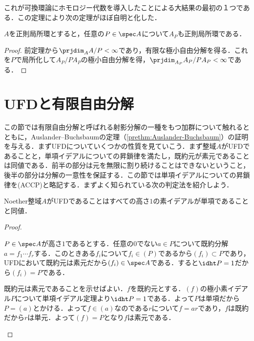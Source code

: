 これが可換環論にホモロジー代数を導入したことによる大結果の最初の１つである．この定理により次の定理がほぼ自明と化した．
\begin{thm}[Serreの定理]\label{thm:Serreの定理}
	$A$を正則局所環とすると，任意の$P\in\spec A$について$A_P$も正則局所環である．
\end{thm}

\begin{proof}
	前定理から$\prjdim_A A/P<\infty$であり，有限な極小自由分解を得る．これを$P$で局所化して$A_P/PA_P$の極小自由分解を得，$\prjdim_{A_P} A_P/PA_P<\infty$である．
\end{proof}

\section{UFDと有限自由分解}

この節では有限自由分解と呼ばれる射影分解の一種をもつ加群について触れるとともに，Auslander--Buchsbaumの定理（\ref{prethm:Auslander-Buchsbaum}）の証明を与える．まずUFDについていくつかの性質を見ていこう．まず整域$A$がUFDであることと，単項イデアルについての昇鎖律を満たし，既約元が素元であることは同値である．前半の部分は元を無限に割り続けることはできないということ，後半の部分は分解の一意性を保証する．この節では単項イデアルについての昇鎖律を(ACCP)と略記する．まずよく知られている次の判定法を紹介しよう．

\begin{prop}\label{prop:UFD判定}
	Noether整域$A$がUFDであることはすべての高さ$1$の素イデアルが単項であることと同値．
\end{prop}

\begin{proof}
	\begin{eqv}
		\item $P\in\spec A$が高さ$1$であるとする．任意の$0$でない$a\in P$について既約分解$a=f_1\cdots f_r$する．このときある$f_i$について$f_i\in (P)$であるから$(f_i)\subset P$であり，UFDにおいて既約元は素元だから$(f_i)\in\spec A$である．すると$\idht P=1$だから$(f_i)=P$である．
		\item 既約元は素元であることを示せばよい．$f$を既約元とする．$(f)$の極小素イデアル$P$について単項イデアル定理より$\idht P=1$である．よって$P$は単項だから$P=(a)$とかける．よって$f\in (a)$なのである$r$について$f=ar$であり，$f$は既約だから$r$は単元．よって$(f)=P$となり$f$は素元である．
	\end{eqv}
\end{proof}

